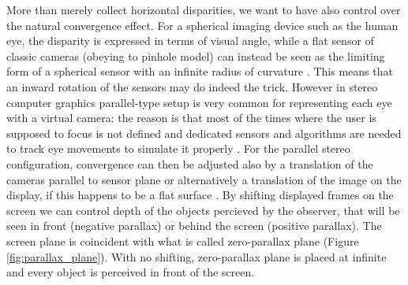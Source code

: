 More than merely collect horizontal disparities, we want to have also control over the natural convergence effect. For a spherical imaging device such as the human eye, the disparity is expressed in terms of visual angle, while a flat sensor of classic cameras (obeying to pinhole model) can instead be seen as the limiting form of a spherical sensor with an infinite radius of curvature \cite{camera_convergence}. This means that an inward rotation of the sensors may do indeed the trick. However in stereo computer graphics parallel-type setup is very common for representing each eye with a virtual camera: the reason is that most of the times where the user is supposed to focus is not defined and dedicated sensors and algorithms are needed to track eye movements to simulate it properly \cite{dynamic_virtual_eye_convergence}. For the parallel stereo configuration, convergence can then be adjusted also by a translation of the cameras parallel to sensor plane or alternatively a translation of the image on the display, if this happens to be a flat surface \cite{camera_convergence}. By shifting displayed frames on the screen we can control depth of the objects percieved by the observer, that will be seen in front (negative parallax) or behind the screen (positive parallax). The screen plane is coincident with what is called zero-parallax plane (Figure \ref{fig:parallax_plane}). With no shifting, zero-parallax plane is placed at infinite and every object is perceived in front of the screen.

